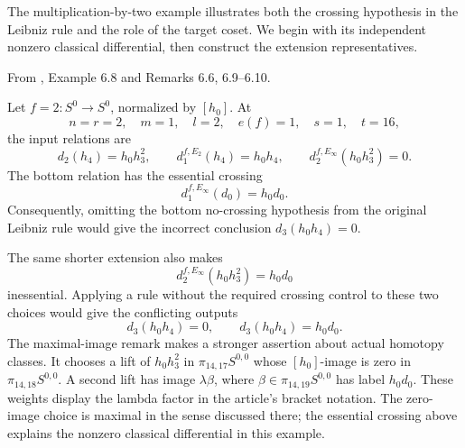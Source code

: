 The multiplication-by-two example illustrates both the crossing
hypothesis in the Leibniz rule and the role of the target coset.
We begin with its independent nonzero classical differential, then
construct the extension representatives.

\begin{proposition}
\label{paper:6.8}
\label{paper:6.6}
\label{paper:6.9}
\label{paper:6.10}
\label{exam:Leibnizno}
\label{rem:chuaerror}
From \cite{LWX126}, Example 6.8 and Remarks 6.6, 6.9--6.10.\par
Let $f=2:S^0\to S^0$, normalized by $[h_0]$. At
\[
n=r=2,\quad m=1,\quad l=2,\quad e(f)=1,\quad s=1,\quad t=16,
\]
the input relations are
\[
d_2(h_4)=h_0h_3^2,\qquad
d_1^{f,E_2}(h_4)=h_0h_4,\qquad
d_2^{f,E_\infty}(h_0h_3^2)=0.
\]
The bottom relation has the essential crossing
\[
d_1^{f,E_\infty}(d_0)=h_0d_0.
\]
Consequently, omitting the bottom no-crossing hypothesis from the original Leibniz rule would give the incorrect conclusion $d_3(h_0h_4)=0$.

The same shorter extension also makes
\[
d_2^{f,E_\infty}(h_0h_3^2)=h_0d_0
\]
inessential. Applying a rule without the required crossing control to these two choices would give the conflicting outputs
\[
d_3(h_0h_4)=0,\qquad d_3(h_0h_4)=h_0d_0.
\]
The maximal-image remark makes a stronger assertion about actual
homotopy classes. It chooses a lift of $h_0h_3^2$ in
$\pi_{14,17}S^{0,0}$ whose $[h_0]$-image is zero in
$\pi_{14,18}S^{0,0}$. A second lift has image $\lambda\beta$,
where $\beta\in\pi_{14,19}S^{0,0}$ has label $h_0d_0$.
These weights display the lambda factor in the article's bracket
notation. The zero-image choice is maximal in the sense discussed there;
the essential crossing above explains the nonzero classical differential
in this example.
\end{proposition}
